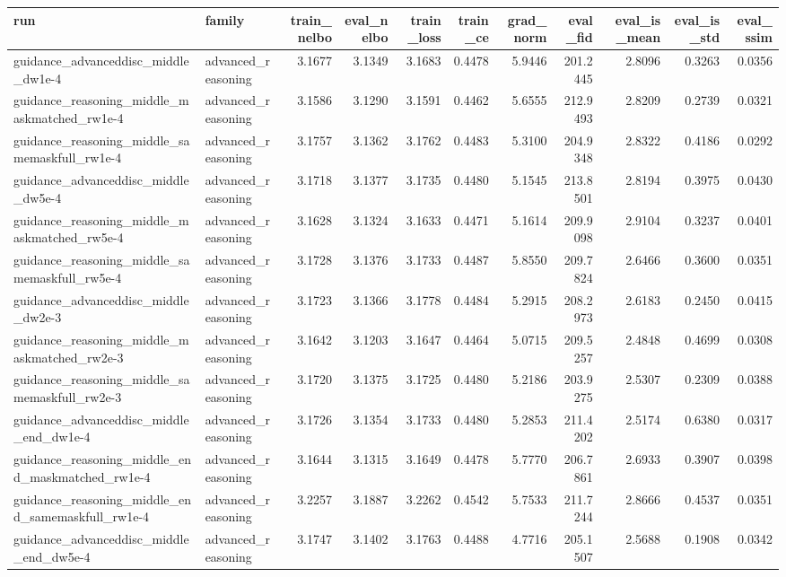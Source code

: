 \begin{tabular}{llrrrrrrrrr}
\toprule
run & family & train_nelbo & eval_nelbo & train_loss & train_ce & grad_norm & eval_fid & eval_is_mean & eval_is_std & eval_ssim \\
\midrule
guidance_advanceddisc_middle_dw1e-4 & advanced_reasoning & 3.1677 & 3.1349 & 3.1683 & 0.4478 & 5.9446 & 201.2445 & 2.8096 & 0.3263 & 0.0356 \\
guidance_reasoning_middle_maskmatched_rw1e-4 & advanced_reasoning & 3.1586 & 3.1290 & 3.1591 & 0.4462 & 5.6555 & 212.9493 & 2.8209 & 0.2739 & 0.0321 \\
guidance_reasoning_middle_samemaskfull_rw1e-4 & advanced_reasoning & 3.1757 & 3.1362 & 3.1762 & 0.4483 & 5.3100 & 204.9348 & 2.8322 & 0.4186 & 0.0292 \\
guidance_advanceddisc_middle_dw5e-4 & advanced_reasoning & 3.1718 & 3.1377 & 3.1735 & 0.4480 & 5.1545 & 213.8501 & 2.8194 & 0.3975 & 0.0430 \\
guidance_reasoning_middle_maskmatched_rw5e-4 & advanced_reasoning & 3.1628 & 3.1324 & 3.1633 & 0.4471 & 5.1614 & 209.9098 & 2.9104 & 0.3237 & 0.0401 \\
guidance_reasoning_middle_samemaskfull_rw5e-4 & advanced_reasoning & 3.1728 & 3.1376 & 3.1733 & 0.4487 & 5.8550 & 209.7824 & 2.6466 & 0.3600 & 0.0351 \\
guidance_advanceddisc_middle_dw2e-3 & advanced_reasoning & 3.1723 & 3.1366 & 3.1778 & 0.4484 & 5.2915 & 208.2973 & 2.6183 & 0.2450 & 0.0415 \\
guidance_reasoning_middle_maskmatched_rw2e-3 & advanced_reasoning & 3.1642 & 3.1203 & 3.1647 & 0.4464 & 5.0715 & 209.5257 & 2.4848 & 0.4699 & 0.0308 \\
guidance_reasoning_middle_samemaskfull_rw2e-3 & advanced_reasoning & 3.1720 & 3.1375 & 3.1725 & 0.4480 & 5.2186 & 203.9275 & 2.5307 & 0.2309 & 0.0388 \\
guidance_advanceddisc_middle_end_dw1e-4 & advanced_reasoning & 3.1726 & 3.1354 & 3.1733 & 0.4480 & 5.2853 & 211.4202 & 2.5174 & 0.6380 & 0.0317 \\
guidance_reasoning_middle_end_maskmatched_rw1e-4 & advanced_reasoning & 3.1644 & 3.1315 & 3.1649 & 0.4478 & 5.7770 & 206.7861 & 2.6933 & 0.3907 & 0.0398 \\
guidance_reasoning_middle_end_samemaskfull_rw1e-4 & advanced_reasoning & 3.2257 & 3.1887 & 3.2262 & 0.4542 & 5.7533 & 211.7244 & 2.8666 & 0.4537 & 0.0351 \\
guidance_advanceddisc_middle_end_dw5e-4 & advanced_reasoning & 3.1747 & 3.1402 & 3.1763 & 0.4488 & 4.7716 & 205.1507 & 2.5688 & 0.1908 & 0.0342 \\

\end{tabular}

